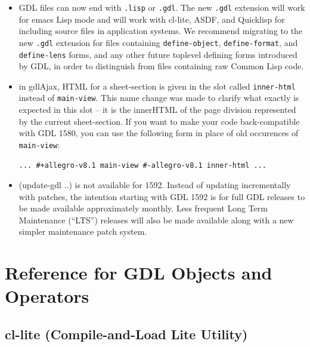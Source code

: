 \documentclass [11pt]{book}
\begin{document}
\begin{itemize}
\item GDL files can now end with \texttt{.lisp} or \texttt{.gdl}. The new \texttt{.gdl} extension will work for emacs Lisp mode and will work with
	 cl-lite, ASDF, and Quicklisp for including source files in application systems. We recommend migrating
to the new \texttt{.gdl} extension for files containing \texttt{define-object}, \texttt{define-format}, and \texttt{define-lens} forms, and any other future toplevel defining forms introduced by GDL, in order to distinguish 
from files containing raw Common Lisp code.

\item in gdlAjax, HTML for a sheet-section is given in the slot called \texttt{inner-html} instead of \texttt{main-view}. This name change was made to clarify what exactly is
	 expected in this slot -- it is the innerHTML of the page
	 division represented by the current sheet-section. If you
	 want to make your code back-compatible with GDL 1580, you can
	 use the following form in place of old occurences of \texttt{main-view}: 

\begin{verbatim}... #+allegro-v8.1 main-view #-allegro-v8.1 inner-html ...
\end{verbatim}

\item (update-gdl ..) is not available for 1592. Instead
of updating incrementally with patches, the intention starting with
GDL 1592 is for full GDL releases to be made available approximately
monthly. Less frequent Long Term Maintenance (``LTS'') releases will
also be made available along with a new simpler maintenance patch
system.

\end{itemize}



\chapter{Reference for GDL Objects and Operators}

\label{chap:referenceforgdlobjectsandoperators}



\section{cl-lite (Compile-and-Load Lite Utility)}

\label{sec:cl-lite(compile-and-loadliteutility)}
\end{document}
